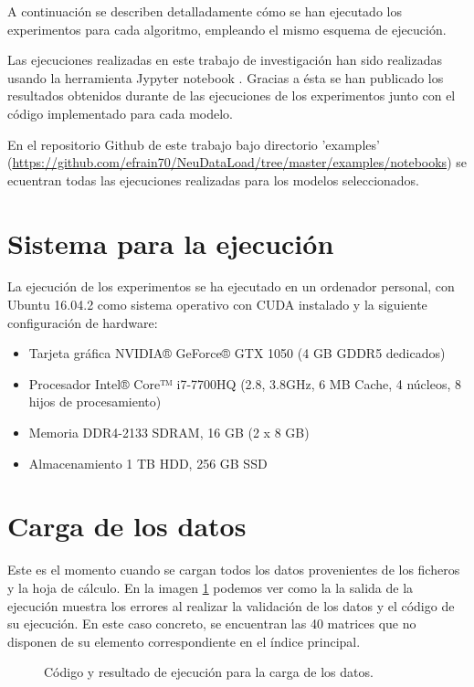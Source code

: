 A continuación se describen detalladamente cómo se han ejecutado los experimentos para cada algoritmo, empleando el mismo esquema de ejecución.

Las ejecuciones realizadas en este trabajo de investigación han sido realizadas usando la herramienta Jypyter notebook \cite{ProjectHome}. Gracias a ésta se han publicado los resultados obtenidos durante de las ejecuciones de los experimentos  junto con el código implementado para cada modelo. 

En el repositorio Github de este trabajo bajo directorio 'examples' (\url{https://github.com/efrain70/NeuDataLoad/tree/master/examples/notebooks}) se ecuentran todas las ejecuciones realizadas para los modelos seleccionados.

\section{Sistema para la ejecución}
La ejecución de los experimentos se ha ejecutado en un ordenador personal, con Ubuntu 16.04.2 como sistema operativo con CUDA \cite{ProcesamientoNVIDIA} instalado y la siguiente configuración de hardware:
\begin{itemize}
    \item Tarjeta gráfica NVIDIA® GeForce® GTX 1050 (4 GB GDDR5 dedicados)
    \item Procesador Intel® Core™ i7-7700HQ (2.8, 3.8GHz, 6 MB Cache, 4 núcleos, 8 hijos de procesamiento)
    \item Memoria DDR4-2133 SDRAM, 16 GB (2 x 8 GB)
    \item Almacenamiento 1 TB HDD,  256 GB SSD
\end{itemize}

\section{Carga de los datos}
Este es el momento cuando se cargan todos los datos provenientes de los ficheros y la hoja de cálculo. En la imagen \ref{figure:codeload} podemos ver como la la salida de la ejecución muestra los errores al realizar la validación de los datos y el código de su ejecución. En este caso concreto, se encuentran las 40 matrices que no disponen de su elemento correspondiente en el índice principal.

\begin{figure}[H]
\centering
{}
\caption{Código y resultado de ejecución para la carga de los datos.}
\label{figure:codeload}
\end{figure}


